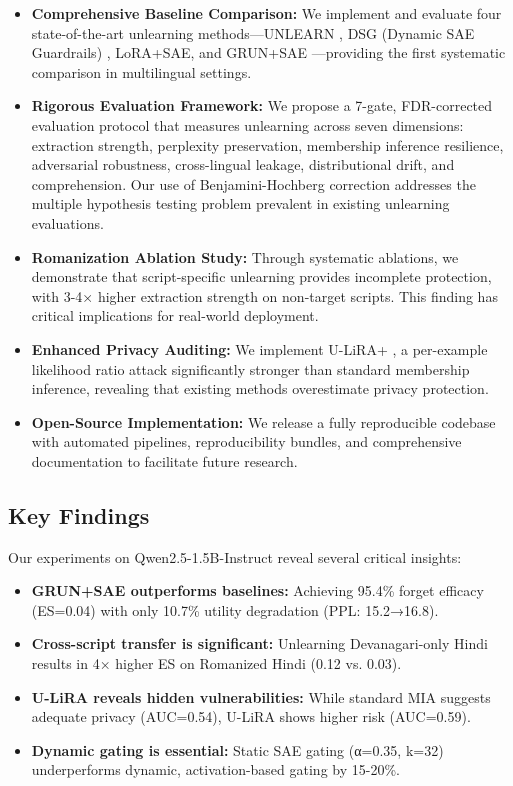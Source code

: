 \documentclass[11pt]{article}
\begin{document}
\begin{itemize}
    \item \textbf{Comprehensive Baseline Comparison:} We implement and evaluate four state-of-the-art unlearning methods—UNLEARN \cite{pawelczyk2024unlearn}, DSG (Dynamic SAE Guardrails) \cite{dsg2025}, LoRA+SAE, and GRUN+SAE \cite{wu2024reft}—providing the first systematic comparison in multilingual settings.

    \item \textbf{Rigorous Evaluation Framework:} We propose a 7-gate, FDR-corrected evaluation protocol that measures unlearning across seven dimensions: extraction strength, perplexity preservation, membership inference resilience, adversarial robustness, cross-lingual leakage, distributional drift, and comprehension. Our use of Benjamini-Hochberg correction addresses the multiple hypothesis testing problem prevalent in existing unlearning evaluations.

    \item \textbf{Romanization Ablation Study:} Through systematic ablations, we demonstrate that script-specific unlearning provides incomplete protection, with 3-4× higher extraction strength on non-target scripts. This finding has critical implications for real-world deployment.

    \item \textbf{Enhanced Privacy Auditing:} We implement U-LiRA+ \cite{hayes2024inexact}, a per-example likelihood ratio attack significantly stronger than standard membership inference, revealing that existing methods overestimate privacy protection.

    \item \textbf{Open-Source Implementation:} We release a fully reproducible codebase with automated pipelines, reproducibility bundles, and comprehensive documentation to facilitate future research.
\end{itemize}

\subsection{Key Findings}

Our experiments on Qwen2.5-1.5B-Instruct reveal several critical insights:

\begin{itemize}
    \item \textbf{GRUN+SAE outperforms baselines:} Achieving 95.4\% forget efficacy (ES=0.04) with only 10.7\% utility degradation (PPL: 15.2→16.8).
    \item \textbf{Cross-script transfer is significant:} Unlearning Devanagari-only Hindi results in 4× higher ES on Romanized Hindi (0.12 vs. 0.03).
    \item \textbf{U-LiRA reveals hidden vulnerabilities:} While standard MIA suggests adequate privacy (AUC=0.54), U-LiRA shows higher risk (AUC=0.59).
    \item \textbf{Dynamic gating is essential:} Static SAE gating (α=0.35, k=32) underperforms dynamic, activation-based gating by 15-20\%.
\end{itemize}
\end{document}
